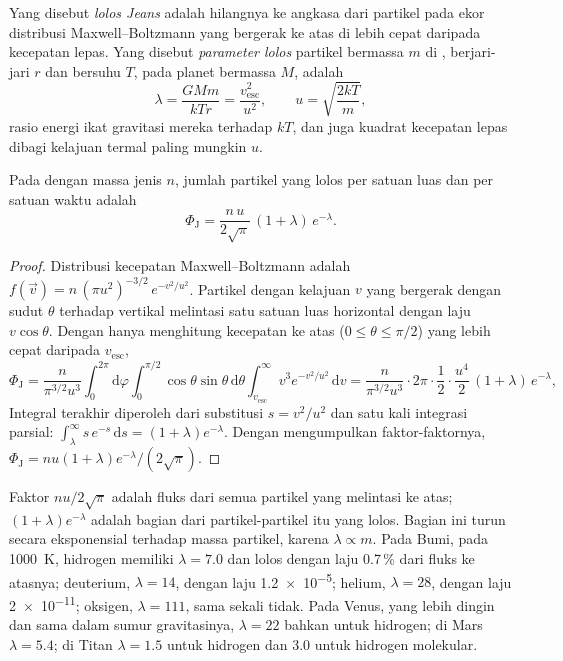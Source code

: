 \begin{definition}\label{def:b3:planetary-atmospheres:jeans-escape}
Yang disebut \emph{lolos Jeans} adalah hilangnya ke angkasa dari
partikel pada ekor distribusi Maxwell--Boltzmann yang bergerak ke atas di 
lebih cepat daripada kecepatan lepas. Yang disebut \emph{parameter
lolos} partikel bermassa $m$ di ,
berjari-jari $r$ dan bersuhu $T$, pada planet bermassa $M$, adalah
\[
\lambda = \frac{GMm}{kTr} = \frac{v_\mathrm{esc}^2}{u^2},
\qquad u = \sqrt{\frac{2kT}m},
\]
rasio energi ikat gravitasi mereka terhadap $kT$, dan juga kuadrat
kecepatan lepas dibagi kelajuan termal paling mungkin $u$.
\end{definition}

\begin{theorem}\label{thm:b3:planetary-atmospheres:jeans}
Pada  dengan massa jenis $n$, jumlah partikel yang lolos per satuan
luas dan per satuan waktu adalah
\[
\Phi_\mathrm J = \frac{n\,u}{2\sqrt\pi}\,(1 + \lambda)\,e^{-\lambda}.
\]
\end{theorem}

\begin{proof}
Distribusi kecepatan Maxwell--Boltzmann adalah $f(\vec v) =
n\,(\pi u^2)^{-3/2}\,e^{-v^2/u^2}$. Partikel dengan kelajuan $v$ yang bergerak dengan sudut
$\theta$ terhadap vertikal melintasi satu satuan luas horizontal dengan
laju $v\cos\theta$. Dengan hanya menghitung kecepatan ke atas ($0 \le \theta \le
\pi/2$) yang lebih cepat daripada $v_\mathrm{esc}$,
\[
\Phi_\mathrm J = \frac{n}{\pi^{3/2}u^3}\int_0^{2\pi}\!\!\mathrm d\varphi
\int_0^{\pi/2}\!\!\cos\theta\sin\theta\,\mathrm d\theta
\int_{v_\mathrm{esc}}^\infty v^3e^{-v^2/u^2}\,\mathrm dv
= \frac{n}{\pi^{3/2}u^3}\cdot2\pi\cdot\frac12\cdot
\frac{u^4}2\,(1 + \lambda)\,e^{-\lambda},
\]
Integral terakhir diperoleh dari substitusi $s = v^2/u^2$ dan
satu kali integrasi parsial: $\int_\lambda^\infty s\,e^{-s}\,\mathrm ds =
(1 + \lambda)e^{-\lambda}$. Dengan mengumpulkan faktor-faktornya, $\Phi_\mathrm J = n u (1 +
\lambda) e^{-\lambda}/(2\sqrt\pi)$.
\end{proof}

Faktor $n u/2\sqrt\pi$ adalah fluks dari semua partikel yang melintasi
 ke atas; $(1 + \lambda)e^{-\lambda}$ adalah bagian dari partikel-partikel itu
yang lolos. Bagian ini turun secara eksponensial terhadap massa partikel, karena
$\lambda \propto m$. Pada  Bumi, pada \qty{1000}{K}, hidrogen
memiliki $\lambda = 7.0$ dan lolos dengan laju 0.7\,\% dari fluks ke atasnya;
deuterium, $\lambda = 14$, dengan laju \num{1.2e-5}; helium, $\lambda = 28$,
dengan laju \num{2e-11}; oksigen, $\lambda = 111$, sama sekali tidak. Pada 
Venus, yang lebih dingin dan sama dalam sumur gravitasinya, $\lambda = 22$ bahkan untuk
hidrogen; di Mars $\lambda = 5.4$; di Titan $\lambda = 1.5$ untuk hidrogen
dan 3.0 untuk hidrogen molekular.

